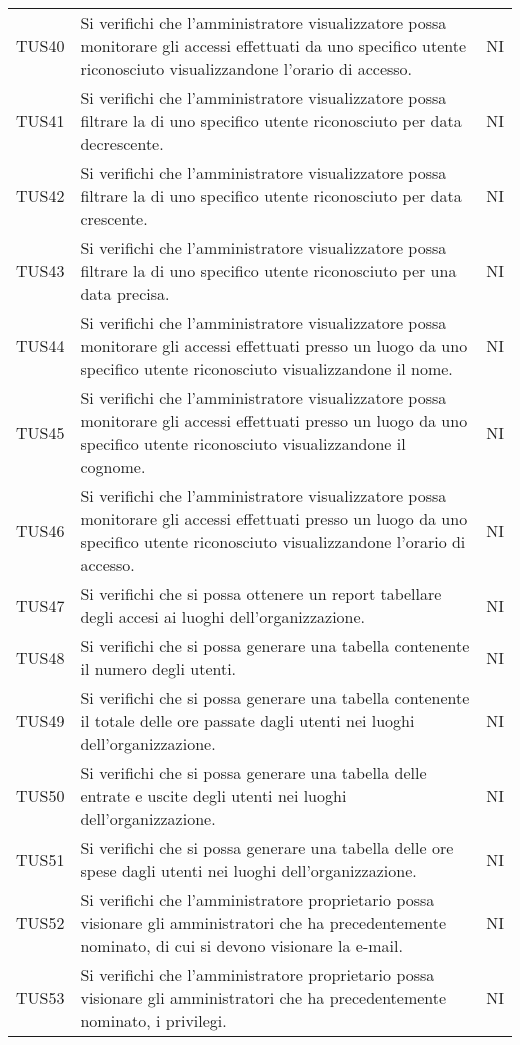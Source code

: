 {\begin{longtable}{ c C{13cm} C{1cm}}
TUS40 & Si verifichi che l’amministratore visualizzatore possa monitorare gli accessi effettuati da uno specifico utente riconosciuto visualizzandone l’orario di accesso. & NI \\
TUS41 & Si verifichi che l’amministratore visualizzatore possa filtrare la  di uno specifico utente riconosciuto per data decrescente. & NI \\
TUS42 & Si verifichi che l’amministratore visualizzatore possa filtrare la  di uno specifico utente riconosciuto per data crescente. & NI \\
TUS43 & Si verifichi che l’amministratore visualizzatore possa filtrare la  di uno specifico utente riconosciuto per una data precisa. & NI \\
TUS44 & Si verifichi che l’amministratore visualizzatore possa monitorare gli accessi effettuati presso un luogo da uno specifico utente riconosciuto visualizzandone il nome. & NI \\
TUS45 & Si verifichi che l’amministratore visualizzatore possa monitorare gli accessi effettuati presso un luogo da uno specifico utente riconosciuto visualizzandone il cognome. & NI \\
TUS46 & Si verifichi che l’amministratore visualizzatore possa monitorare gli accessi effettuati presso un luogo da uno specifico utente riconosciuto visualizzandone l’orario di accesso. & NI \\
TUS47 & Si verifichi che si possa ottenere un report tabellare degli accesi ai luoghi dell'organizzazione. & NI \\
TUS48 & Si verifichi che si possa generare una tabella contenente il numero degli utenti. & NI \\
TUS49 & Si verifichi che si possa generare una tabella contenente il totale delle ore passate dagli utenti nei luoghi dell’organizzazione. & NI \\
TUS50 & Si verifichi che si possa generare una tabella delle entrate e uscite degli utenti nei luoghi dell'organizzazione. & NI \\
TUS51 & Si verifichi che si possa generare una tabella delle ore spese dagli utenti nei luoghi dell'organizzazione. & NI \\
TUS52 & Si verifichi che l’amministratore proprietario possa visionare gli amministratori che ha precedentemente nominato, di cui si devono visionare la e-mail. & NI \\
TUS53 & Si verifichi che l’amministratore proprietario possa visionare gli amministratori che ha precedentemente nominato, i privilegi. & NI \\

\end{longtable}}
